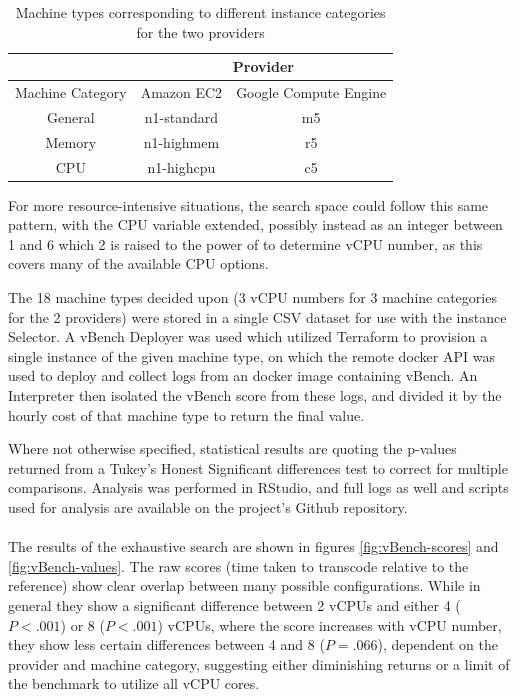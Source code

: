 \documentclass{article}
\begin{document}
\begin{table}[!hb]
\centering
\begin{tabular}{ |c||c|c|  }
 \hline
 & \multicolumn{2}{|c|}{Provider} \\
 \hline
 Machine Category & Amazon EC2 & Google Compute Engine \\
 \hline
 General& n1-standard & m5\\
 Memory & n1-highmem  & r5\\
 CPU    & n1-highcpu  & c5\\
 \hline
\end{tabular}
\caption{Machine types corresponding to different instance categories for the two providers}
\label{tab:instance-types}
\end{table}

For more resource-intensive situations, the search space could follow this same pattern, with the CPU variable extended, possibly instead as an integer between 1 and 6 which 2 is raised to the power of to determine vCPU number, as this covers many of the available CPU options.

The 18 machine types decided upon (3 vCPU numbers for 3 machine categories for the 2 providers) were stored in a single CSV dataset for use with the instance Selector. A vBench Deployer was used which utilized Terraform to provision a single instance of the given machine type, on which the remote docker API was used to deploy and collect logs from an docker image containing vBench. An Interpreter then isolated the vBench score from these logs, and divided it by the hourly cost of that machine type to return the final value.

Where not otherwise specified, statistical results are quoting the p-values returned from a Tukey's Honest Significant differences test to correct for multiple comparisons. Analysis was performed in RStudio\cite{R, RStudio}, and full logs as well and scripts used for analysis are available on the project's Github repository.

\paragraph{}
The results of the exhaustive search are shown in figures \ref{fig:vBench-scores} and \ref{fig:vBench-values}. The raw scores (time taken to transcode relative to the reference) show clear overlap between many possible configurations. While in general they show a significant difference between 2 vCPUs and either 4 ($P < .001$) or 8 ($P < .001$) vCPUs, where the score increases with vCPU number, they show less certain differences between 4 and 8 ($P = .066$), dependent on the provider and machine category, suggesting either diminishing returns or a limit of the benchmark to utilize all vCPU cores.
 
\end{document}
